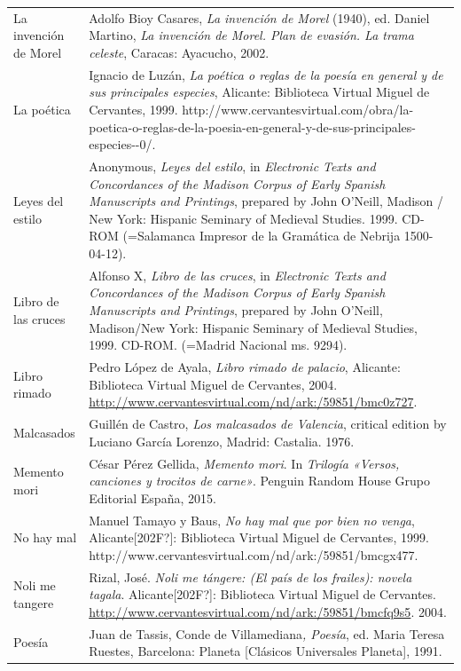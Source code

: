 \begin{flushleft}
\begin{supertabular}{m{1.7955599in}m{4.42126in}}
La invención de Morel  &
Adolfo Bioy Casares, \textit{La invención de Morel} (1940), ed. Daniel Martino, \textit{La invención de Morel. Plan de evasión. La trama celeste}, Caracas: Ayacucho, 2002.\\
La poética &
Ignacio de Luzán, \textit{La poética o reglas de la poesía en general y de sus principales especies}, Alicante: Biblioteca Virtual Miguel de Cervantes, 1999. http://www.cervantesvirtual.com/obra/la-poetica-o-reglas-de-la-poesia-en-general-y-de-sus-principales-especies-{}-0/.\\
Leyes del estilo  &
Anonymous, \textit{Leyes del estilo}, in \textit{Electronic Texts and Concordances of the Madison Corpus of Early Spanish Manuscripts and Printings},\textit{ }prepared by John O’Neill, Madison / New York: Hispanic Seminary of Medieval Studies. 1999. CD-ROM (=Salamanca Impresor de la Gramática de Nebrija 1500-04-12).\\
Libro de las cruces  &
Alfonso X, \textit{Libro de las cruces}, in \textit{Electronic Texts and Concordances of the Madison Corpus of Early Spanish Manuscripts and Printings},\textit{ }prepared by John O’Neill, Madison/New York: Hispanic Seminary of Medieval Studies, 1999. CD-ROM. (=Madrid Nacional ms. 9294).\\
Libro rimado  &
Pedro López de Ayala,\textit{ Libro rimado de palacio}, Alicante: Biblioteca Virtual Miguel de Cervantes,\textit{ }2004.\textit{ }\url{http://www.cervantesvirtual.com/nd/ark:/59851/bmc0z727}.\\
Malcasados  &
Guillén de Castro, \textit{Los malcasados de Valencia}, critical edition by Luciano García Lorenzo, Madrid: Castalia. 1976.\\
Memento mori  &
César Pérez Gellida, \textit{Memento mori}. In \textit{Trilogía «Versos, canciones y trocitos de carne»}. Penguin Random House Grupo Editorial España, 2015.\\
No hay mal &
Manuel Tamayo y Baus, \textit{No hay mal que por bien no venga}, Alicante[202F?]: Biblioteca Virtual Miguel de Cervantes, 1999. http://www.cervantesvirtual.com/nd/ark:/59851/bmcgx477.\\
Noli me tangere  &
Rizal, José. \textit{Noli me tángere: (El país de los frailes): novela tagala}. Alicante[202F?]: Biblioteca Virtual Miguel de Cervantes. \url{http://www.cervantesvirtual.com/nd/ark:/59851/bmcfq9s5}. 2004.\\
Poesía  &
Juan de Tassis, Conde de Villamediana\textit{, Poesía}, ed. Maria Teresa Ruestes, Barcelona: Planeta [Clásicos Universales Planeta], 1991.\\

\end{supertabular}
\end{flushleft}

